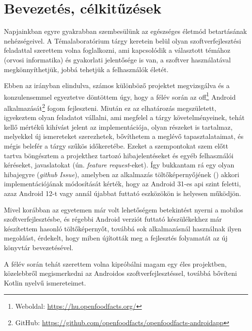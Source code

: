\chapter{Bevezetés, célkitűzések}
Napjainkban egyre gyakrabban szembesülünk az egészséges életmód betartásának nehézségeivel.
A Témalaboratórium tárgy keretein belül olyan szoftverfejlesztési feladattal szerettem volna
foglalkozni, ami kapcsolódik a választott témához (orvosi informatika) és gyakorlati
jelentősége is van, a szoftver használatával megkönnyíthetjük, jobbá tehetjük a felhasználók életét.

Ebben az irányban elindulva, számos különböző projektet megvizsgálva és a konzulensemmel egyeztetve
döntöttem úgy, hogy a félév során az \acrlong{off}\footnote{Weboldal: \url{https://hu.openfoodfacts.org/}}
Android alkalmazását\footnote{GitHub: \url{https://github.com/openfoodfacts/openfoodfacts-androidapp}} fogom fejleszteni.
Miután ez az elhatározás megszületett, igyekeztem olyan feladatot vállalni,
ami megfelel a tárgy követelményeinek, tehát kellő mértékű kihívást jelent
az implementációja, olyan részeket is tartalmaz, melyekkel új ismereteket szerezhetek, bővíthetem a meglévő tapasztalataimat, és mégis
belefér a tárgy szűkös időkeretébe. Ezeket a szempontokat szem előtt tartva böngésztem a
projekthez tartozó hibajelentéseket és egyéb felhasználói kéréseket, javaslatokat (ún. \textit{feature request}-eket).
Így bukkantam rá egy olyan hibajegyre (\textit{\gls{github} Issue}), amelyben az alkalmazás
töltőképernyőjének () akkori implementációjának módosítását kérték, hogy
az Android 31-es \acrshort{api} szint feletti, azaz Android 12-t vagy annál újabbat futtató eszközökön
is helyesen működjön. \cite{issue}

Mivel korábban az egyetemen már volt lehetőségem betekintést nyerni a mobilos szoftverfejlesztésbe,
és régebbi Android verziót futtató készülékekhez már készítettem hasonló töltőképernyőt, továbbá
sok alkalmazásnál használnak ilyen megoldást, érdekelt, hogy miben újították meg a fejlesztés
folyamatát az új könyvtár bevezetésével.

A félév során tehát szerettem volna kipróbálni magam egy éles projektben, közelebbről megismerkedni
az Androidos szoftverfejlesztéssel, továbbá bővíteni Kotlin nyelvű ismereteimet.
